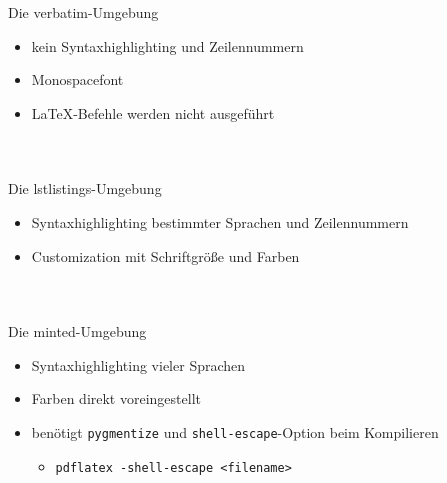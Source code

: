 \documentclass[presentation,aspectratio=169]{beamer}
\begin{document}
\begin{frame}[fragile]{Die verbatim-Umgebung}
  \begin{itemize}
    \item kein Syntaxhighlighting und Zeilennummern
    \item Monospacefont
    \item \LaTeX-Befehle werden nicht ausgeführt
  \end{itemize}
  \begin{columns}
    \begin{column}{.4\textwidth}
      
    \end{column}
    \begin{column}{.5\textwidth}
      \inputminted{latex}{codebeispiele/listings-verbatim.tex}
    \end{column}
  \end{columns}
\end{frame}

\begin{frame}[fragile]{Die lstlistings-Umgebung}
  \begin{itemize}
    \item Syntaxhighlighting bestimmter Sprachen und Zeilennummern
    \item Customization mit Schriftgröße und Farben
  \end{itemize}
  \begin{columns}
    \begin{column}{.4\textwidth}
      
    \end{column}
    \begin{column}{.5\textwidth}
      \inputminted{latex}{codebeispiele/listings-lstlistings.tex}
    \end{column}
  \end{columns}
\end{frame}

\begin{frame}[fragile]{Die minted-Umgebung}
  \begin{itemize}
    \item Syntaxhighlighting vieler Sprachen
    \item Farben direkt voreingestellt
    \item benötigt \verb|pygmentize| und \verb|shell-escape|-Option beim Kompilieren
      \begin{itemize}
        \item \verb|pdflatex -shell-escape <filename>|
      \end{itemize}
  \end{itemize}
  \begin{columns}
    \begin{column}{.4\textwidth}
      
    \end{column}
    \begin{column}{.5\textwidth}
      \inputminted{latex}{codebeispiele/listings-minted.tex}
    \end{column}
  \end{columns}
\end{frame}
\end{document}
